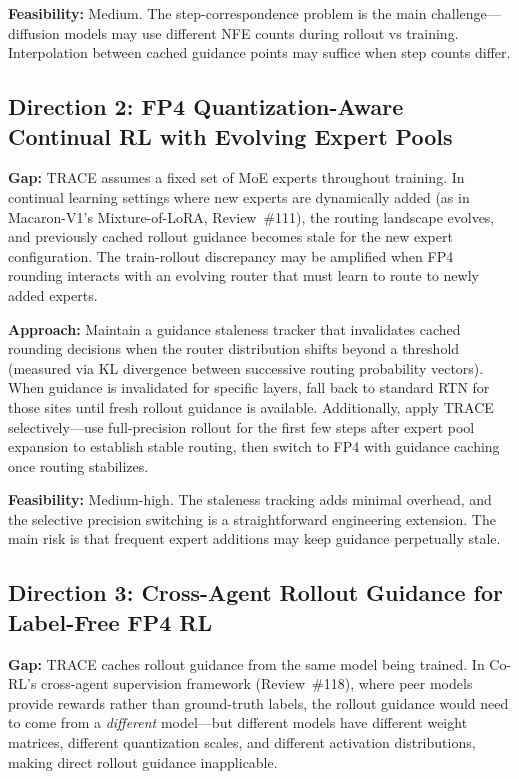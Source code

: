 \documentclass[11pt,a4paper]{article}
\begin{document}
\textbf{Feasibility:} Medium. The step-correspondence problem is the main challenge---diffusion models may use different NFE counts during rollout vs training. Interpolation between cached guidance points may suffice when step counts differ.

\subsection{Direction 2: FP4 Quantization-Aware Continual RL with Evolving Expert Pools}
\textbf{Gap:} TRACE assumes a fixed set of MoE experts throughout training. In continual learning settings where new experts are dynamically added (as in Macaron-V1's Mixture-of-LoRA, Review~\#111), the routing landscape evolves, and previously cached rollout guidance becomes stale for the new expert configuration. The train-rollout discrepancy may be amplified when FP4 rounding interacts with an evolving router that must learn to route to newly added experts.

\textbf{Approach:} Maintain a guidance staleness tracker that invalidates cached rounding decisions when the router distribution shifts beyond a threshold (measured via KL divergence between successive routing probability vectors). When guidance is invalidated for specific layers, fall back to standard RTN for those sites until fresh rollout guidance is available. Additionally, apply TRACE selectively---use full-precision rollout for the first few steps after expert pool expansion to establish stable routing, then switch to FP4 with guidance caching once routing stabilizes.

\textbf{Feasibility:} Medium-high. The staleness tracking adds minimal overhead, and the selective precision switching is a straightforward engineering extension. The main risk is that frequent expert additions may keep guidance perpetually stale.

\subsection{Direction 3: Cross-Agent Rollout Guidance for Label-Free FP4 RL}
\textbf{Gap:} TRACE caches rollout guidance from the same model being trained. In Co-RL's cross-agent supervision framework (Review~\#118), where peer models provide rewards rather than ground-truth labels, the rollout guidance would need to come from a \emph{different} model---but different models have different weight matrices, different quantization scales, and different activation distributions, making direct rollout guidance inapplicable.
\end{document}
